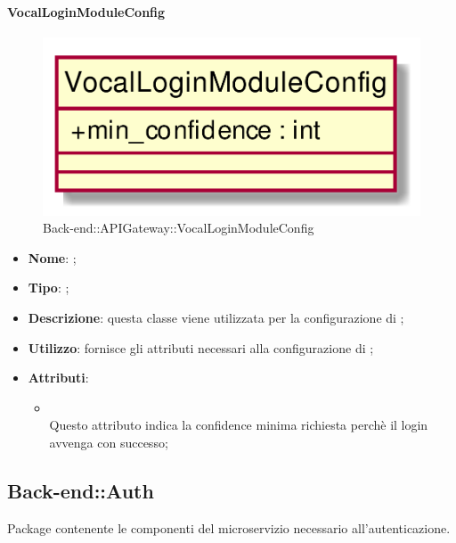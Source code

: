 \hypertarget{VocalLoginModuleConfig_label}{\paragraph{VocalLoginModuleConfig}}
\begin{figure}[h]
	\centering
	\includegraphics[width=\textwidth,height=\textheight,keepaspectratio]{images/ClassVocalLoginModuleConfig.png}
	\caption{Back-end::APIGateway::VocalLoginModuleConfig}
\end{figure}
\begin{itemize}
	\item \textbf{Nome}: ;
	\item \textbf{Tipo}: ;
	\item \textbf{Descrizione}: questa classe viene utilizzata per la configurazione di ;
	\item \textbf{Utilizzo}: fornisce gli attributi necessari alla configurazione di ;
	\item \textbf{Attributi}:
	\begin{itemize}
		\item[]  \\
		Questo attributo indica la confidence minima richiesta perchè il login avvenga con successo;
	\end{itemize}
\end{itemize}
\FloatBarrier

\subsection{Back-end::Auth}
Package contenente le componenti del microservizio necessario all'autenticazione.
